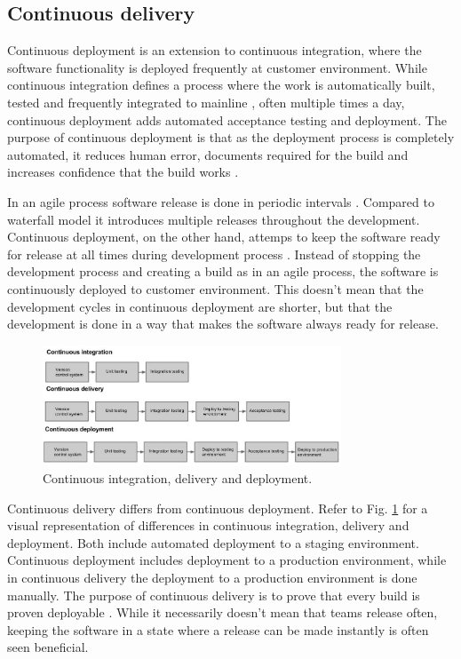 \documentclass[english]{tktltiki2}
\theoremstyle{definition}
\theoremstyle{remark}
\begin{document}
\subsection{Continuous delivery}
Continuous deployment is an extension to continuous integration, where the software functionality is deployed frequently at customer environment. While continuous integration defines a process where the work is automatically built, tested and frequently integrated to mainline \cite{fowler2006continuous}, often multiple times a day, continuous deployment adds automated acceptance testing and deployment. The purpose of continuous deployment is that as the deployment process is completely automated, it reduces human error, documents required for the build and increases confidence that the build works \cite{cdbook}. 

In an agile process software release is done in periodic intervals \cite{cockburn2002agile}. Compared to waterfall model it introduces multiple releases throughout the development. Continuous deployment, on the other hand, attemps to keep the software ready for release at all times during development process \cite{cdbook}. Instead of stopping the development process and creating a build as in an agile process, the software is continuously deployed to customer environment. This doesn't mean that the development cycles in continuous deployment are shorter, but that the development is done in a way that makes the software always ready for release.
\begin{figure}[h]
	\centering
	\includegraphics[width=3.5in]{rtvd.jpg}
	\caption{Continuous integration, delivery and deployment.}
	\label{fig1}
\end{figure}
Continuous delivery differs from continuous deployment. Refer to Fig. \ref{fig1} for a visual representation of differences in continuous integration, delivery and deployment. Both include automated deployment to a staging environment. Continuous deployment includes deployment to a production environment, while in continuous delivery the deployment to a production environment is done manually. The purpose of continuous delivery is to prove that every build is proven deployable \cite{cdbook}. While it necessarily doesn't mean that teams release often, keeping the software in a state where a release can be made instantly is often seen beneficial.
\end{document}
